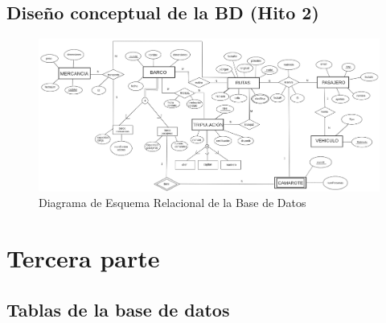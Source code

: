 \documentclass{article}
\begin{document}
\begin{landscape}
\section{Diseño conceptual de la BD (Hito 2)}
\begin{figure}[H]
    \begin{center}
    \end{center}
    \centering
    \vspace{0.3cm}
    \includegraphics[width=600pt, angle=0]{img/DBD_esquemaBD.png}
    \caption{Diagrama de Esquema Relacional de la Base de Datos}
    \vspace{0.3cm}
    \label{titulua}
\end{figure}
\end{landscape}


\section{Tercera parte}
\subsection{Tablas de la base de datos}
\end{document}
